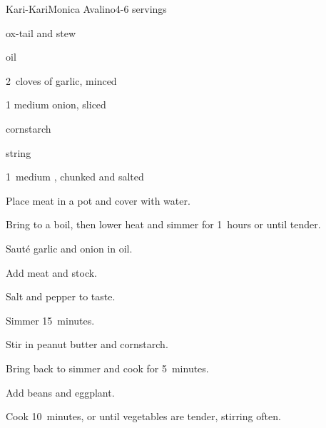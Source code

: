 \begin{recipe}{Kari-Kari}{Monica Avalino}{4-6 servings}

\begin{ingredients}
\item \lbs{2 \half} ox-tail and stew 
\item {} oil
\item 2~cloves of garlic, minced 
\item 1 medium onion, sliced
\item {} 
\item {} cornstarch
\item \lbs{\half} string 
\item 1~medium , chunked and salted
\end{ingredients}

\begin{directions}
\item Place meat in a pot and cover with water.
\item Bring to a boil, then lower heat and simmer for 1\half~hours or until tender.
\item Saut\'e garlic and onion in oil.
\item Add meat and stock.
\item Salt and pepper to taste.
\item Simmer 15~minutes.
\item Stir in peanut butter and cornstarch.
\item Bring back to simmer and cook for 5~minutes.
\item Add beans and eggplant.
\item Cook 10~minutes, or until vegetables are tender, stirring often.
\end{directions}

\end{recipe}
